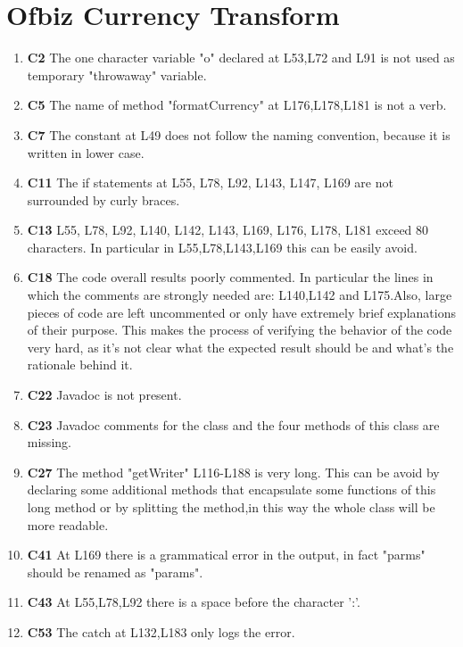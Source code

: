 \section{Ofbiz Currency Transform}

\begin{enumerate}
\item \textbf{C2} The one character variable "o" declared at L53,L72 and L91 is not used as temporary "throwaway" variable.
\item \textbf{C5} The name of method "formatCurrency" at L176,L178,L181 is not a verb.
\item \textbf{C7} The constant at L49 does not follow the naming convention, because it is written in lower case.
\item \textbf{C11} The if statements at L55, L78, L92, L143, L147, L169 are not surrounded by curly braces.
\item \textbf{C13} L55, L78, L92, L140, L142, L143, L169, L176, L178, L181 exceed 80 characters. In particular in L55,L78,L143,L169 this can be easily avoid.
\item \textbf{C18} The code overall results poorly commented. In particular the lines in which the comments are strongly needed are: L140,L142 and L175.Also, large pieces of code are left uncommented or only have extremely brief explanations of their purpose. This makes the process of verifying the behavior of the code very hard, as it’s not clear what the expected result should be and what’s the rationale behind it.
\item \textbf{C22} Javadoc is not present.
\item \textbf{C23} Javadoc comments for the class and the four methods of this class are missing.
\item \textbf{C27} The method "getWriter" L116-L188 is very long. This can be avoid by declaring some additional methods that encapsulate some functions of this long method or by splitting the method,in this way the whole class will be more readable.
\item \textbf{C41} At L169 there is a grammatical error in the output, in fact "parms" should be renamed as "params".
\item \textbf{C43} At L55,L78,L92 there is a space before the character ':'.
\item \textbf{C53} The catch at L132,L183 only logs the error.
\end{enumerate}